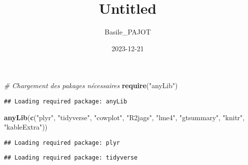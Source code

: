 \documentclass[
]{article}
\title{Untitled}
\author{Basile\_PAJOT}
\date{2023-12-21}
\newenvironment{Shaded}{\begin{snugshade}}{\end{snugshade}}
\newcommand{\CommentTok}[1]{\textcolor[rgb]{0.56,0.35,0.01}{\textit{#1}}}
\newcommand{\FunctionTok}[1]{\textcolor[rgb]{0.13,0.29,0.53}{\textbf{#1}}}
\newcommand{\NormalTok}[1]{#1}
\newcommand{\StringTok}[1]{\textcolor[rgb]{0.31,0.60,0.02}{#1}}
\begin{document}
\maketitle

\begin{Shaded}
\begin{Highlighting}[]
\CommentTok{\# Chargement des pakages nécessaires}
\FunctionTok{require}\NormalTok{(}\StringTok{"anyLib"}\NormalTok{)}
\end{Highlighting}
\end{Shaded}

\begin{verbatim}
## Loading required package: anyLib
\end{verbatim}

\begin{Shaded}
\begin{Highlighting}[]
\FunctionTok{anyLib}\NormalTok{(}\FunctionTok{c}\NormalTok{(}\StringTok{"plyr"}\NormalTok{, }\StringTok{"tidyverse"}\NormalTok{, }\StringTok{"cowplot"}\NormalTok{, }\StringTok{"R2jags"}\NormalTok{, }\StringTok{"lme4"}\NormalTok{, }\StringTok{"gtsummary"}\NormalTok{, }\StringTok{"knitr"}\NormalTok{, }\StringTok{"kableExtra"}\NormalTok{))}
\end{Highlighting}
\end{Shaded}

\begin{verbatim}
## Loading required package: plyr
\end{verbatim}

\begin{verbatim}
## Loading required package: tidyverse
\end{verbatim}
\end{document}
